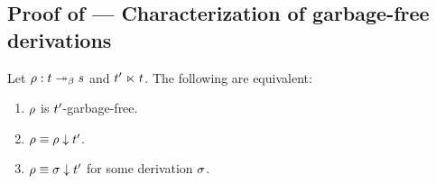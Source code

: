 \subsection*{Proof of  --- Characterization of garbage-free derivations}
\label{characterization_of_garbage_proof}
\label{characterization_of_garbage_free_derivations_proof}
Let $\rho : t \mathrel{\twoheadrightarrow_\beta} s$ and $t' \mathrel{\ltimes} t$.
The following are equivalent:
\begin{enumerate}
\item $\rho$ is $t'$-garbage-free.
\item $\rho \equiv \rho \downarrow t'$.
\item $\rho \equiv \sigma \downarrow t'$ for some derivation $\sigma$.
\end{enumerate}
